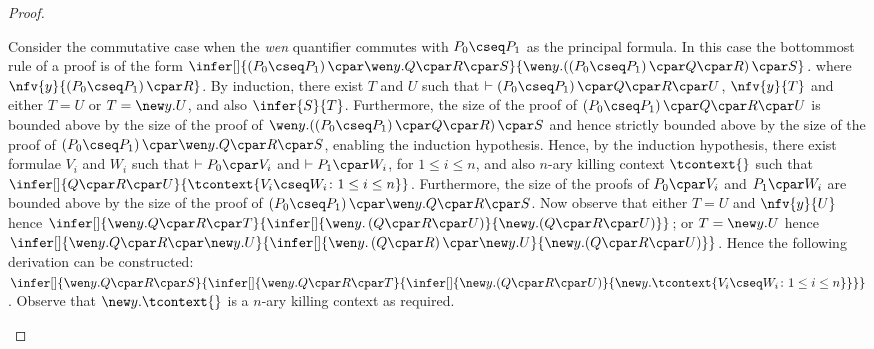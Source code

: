 \documentclass[UKenglish,acmsmall,authorversion]{acmart}
\theoremstyle{plain}
\begin{document}
{\begin{proof}
\begin{enumerate}[label=\textbf{\Alph*},ref=\Alph*,leftmargin=*]
{Consider the commutative case when the \textit{wen} quantifier commutes with $P_0 \cseq P_1$ as the principal formula.
In this case the bottommost rule of a proof is of the form $
\infer[]{
\left( P_0 \cseq P_1 \right) \cpar \wen y. Q \cpar R \cpar S
}{
\mathopen{\wen y.} \left( \left( P_0 \cseq P_1 \right) \cpar Q \cpar R\right) \cpar S
}$. where $\nfv{y}{\left( P_0 \cseq P_1 \right) \cpar R}$.
By induction, there exist $T$ and $U$ such that $\vdash \left( P_0 \cseq P_1 \right) \cpar Q \cpar R \cpar U$, $\nfv{y}{T}$ and either $T = U$ or $T = \new y. U$, and also
$\infer{S}{T}$.
%
Furthermore, the size of the proof of $\left( P_0 \cseq P_1 \right) \cpar Q \cpar R \cpar U$ is bounded above by the size of the proof of $\mathopen{\wen y.} \left( \left( P_0 \cseq P_1 \right) \cpar Q \cpar R\right) \cpar S$ and hence strictly bounded above by the size of the proof of $\left( P_0 \cseq P_1 \right) \cpar \wen y. Q \cpar R \cpar S$, enabling the induction hypothesis.
Hence, by the induction hypothesis, there exist formulae $V_i$ and $W_i$ such that $\vdash P_0 \cpar V_i$ and $\vdash P_1 \cpar W_i$, for $1 \leq i \leq n$, and also $n$-ary killing context $\tcontext{}$ such that
$
\infer[]{
Q \cpar R \cpar U 
}{
 \tcontext{ V_i \cseq W_i \colon 1 \leq i \leq n }
}$.
Furthermore, the size of the proofs of $P_0 \cpar V_i$ and $P_1 \cpar W_i$ are bounded above by the size of the proof of $\left( P_0 \cseq P_1 \right) \cpar \wen y. Q \cpar R \cpar S$.
%
Now observe that either $T = U$ and $\nfv{y}{U}$ hence
$
\infer[]{
\wen y. Q \cpar R \cpar T
}{
\infer[]{
 \wen y. \left(Q \cpar R \cpar U\right) 
}{ \mathopen{\new y.} \left(Q \cpar R \cpar U\right)
}}$;
or $T = \new y. U$ hence $
\infer[]{
\wen y. Q \cpar R \cpar \new y. U
}{
\infer[]{
 \wen y. \left(Q \cpar R\right) \cpar \new y. U 
}{
 \mathopen{\new y.} \left(Q \cpar R \cpar U\right)
}}$.
Hence the following derivation can be constructed:
$
\infer[]{
\wen y. Q \cpar R \cpar S
}{
\infer[]{
\wen y. Q \cpar R \cpar T
}{
\infer[]{
\mathopen{\new y.} \left( Q \cpar R \cpar U \right)
}{
\mathopen{\new y.} \tcontext{ V_i \cseq W_i \colon 1 \leq i \leq n }
}}}
$.
Observe that $\new y. \tcontext{ }$ is a $n$-ary killing context as required.
\smallskip




}
\end{enumerate}
\end{proof}}
\end{document}
